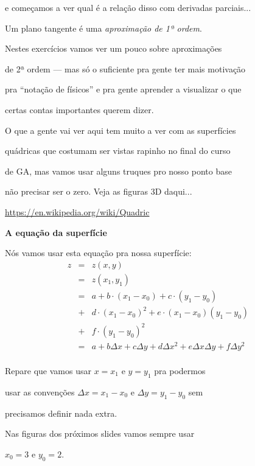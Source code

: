 \documentclass[oneside,12pt]{article}
\begin{document}
e começamos a ver qual é a relação disso com derivadas parciais...

\msk

Um plano tangente é uma {\sl aproximação de 1ª ordem}.

Nestes exercícios vamos ver um pouco sobre aproximações

de 2ª ordem --- mas só o suficiente pra gente ter mais motivação

pra ``notação de físicos'' e pra gente aprender a visualizar o que

certas contas importantes querem dizer.


\msk

O que a gente vai ver aqui tem muito a ver com as superfícies

quádricas que costumam ser vistas rapinho no final do curso

de GA, mas vamos usar alguns truques pro nosso ponto base

não precisar ser o zero. Veja as figuras 3D daqui...

\msk

{\scriptsize

\url{https://en.wikipedia.org/wiki/Quadric}

}


\newpage

{\bf A equação da superfície}

Nós vamos usar esta equação pra nossa superfície:
%
$$\begin{array}{rcl}
  z &=& z(x,y) \\
    &=& z(x_1,y_1) \\
    &=& a + b·(x_1-x_0) + c·(y_1-y_0) \\
    &+& d·(x_1-x_0)^2 + e·(x_1-x_0)(y_1-y_0) \\
    &+& f·(y_1-y_0)^2 \\
    &=& a + bΔx + cΔy + dΔx^2 + eΔxΔy + fΔy^2 \\
  \end{array}
$$

Repare que vamos usar $x=x_1$ e $y=y_1$ pra podermos

usar as convenções $Δx=x_1-x_0$ e $Δy=y_1-y_0$ sem

precisamos definir nada extra.

\msk

Nas figuras dos próximos slides vamos sempre usar

$x_0=3$ e $y_0=2$.

\newpage

\end{document}
